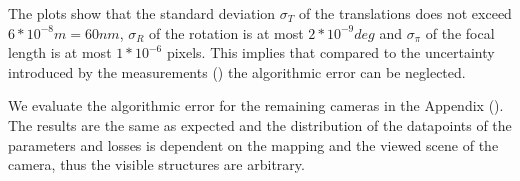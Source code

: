 The plots show that the standard deviation $\sigma_T$ of the translations does not exceed $6 * 10^{-8} m = 60 nm$, $\sigma_R$ of the rotation is at most $2 * 10^{-9} deg$ and $\sigma_{\pi}$ of the focal length is at most $1 * 10^{-6}$ pixels.
This implies that compared to the uncertainty introduced by the measurements () the algorithmic error can be neglected.   

We evaluate the algorithmic error for the remaining cameras in the Appendix (). 
The results are the same as expected and the distribution of the datapoints of the parameters and losses is dependent on the mapping and the viewed scene of the camera, thus the visible structures are arbitrary. 
